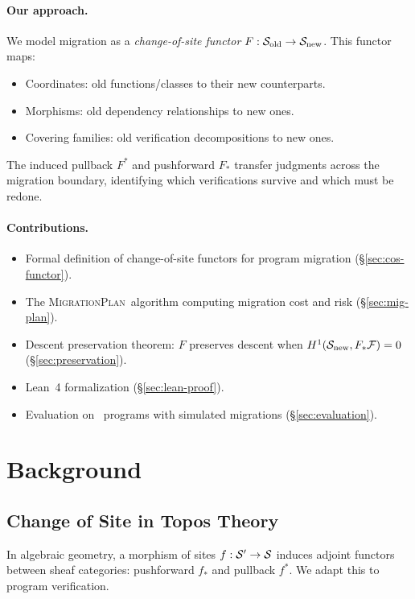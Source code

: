 \documentclass[11pt]{article}
\newcommand{\MigPlan}{\textsc{MigrationPlan}}
\newcommand{\SiteOld}{\Site_{\mathrm{old}}}
\newcommand{\SiteNew}{\Site_{\mathrm{new}}}
\newcommand{\FunctorF}{F}
\newcommand{\Pullback}{F^*}
\newcommand{\Pushforward}{F_*}
\begin{document}
\paragraph{Our approach.}
We model migration as a \emph{change-of-site functor} $\FunctorF : \SiteOld
\to \SiteNew$.  This functor maps:
\begin{itemize}[noitemsep]
  \item Coordinates: old functions/classes to their new counterparts.
  \item Morphisms: old dependency relationships to new ones.
  \item Covering families: old verification decompositions to new ones.
\end{itemize}
The induced pullback $\Pullback$ and pushforward $\Pushforward$ transfer
judgments across the migration boundary, identifying which verifications
survive and which must be redone.

\paragraph{Contributions.}
\begin{itemize}[noitemsep]
  \item Formal definition of change-of-site functors for program migration
        (§\ref{sec:cos-functor}).
  \item The \MigPlan\ algorithm computing migration cost and risk
        (§\ref{sec:mig-plan}).
  \item Descent preservation theorem: $\FunctorF$ preserves descent when
        $\Hcoh{1}(\SiteNew, \Pushforward\mathcal{F}) = 0$
        (§\ref{sec:preservation}).
  \item Lean~4 formalization (§\ref{sec:lean-proof}).
  \item Evaluation on \compTotalPrograms\ programs with simulated
        migrations (§\ref{sec:evaluation}).
\end{itemize}

\section{Background}\label{sec:background}

\subsection{Change of Site in Topos Theory}
In algebraic geometry, a morphism of sites $f : \mathcal{S}' \to \mathcal{S}$ induces
adjoint functors between sheaf categories: pushforward $f_*$ and pullback
$f^*$.  We adapt this to program verification.
\end{document}
